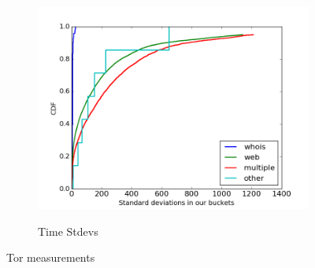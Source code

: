 \begin{figure}
\begin{subfigure}[t]{0.32\textwidth}
		\includegraphics[scale=0.3]{images/stddevs.png}
		\label{fig:stats_c}
		\caption{Time Stdevs}
	\end{subfigure}
	\label{fig:measurements}
	\caption{Tor measurements}
\end{figure}
